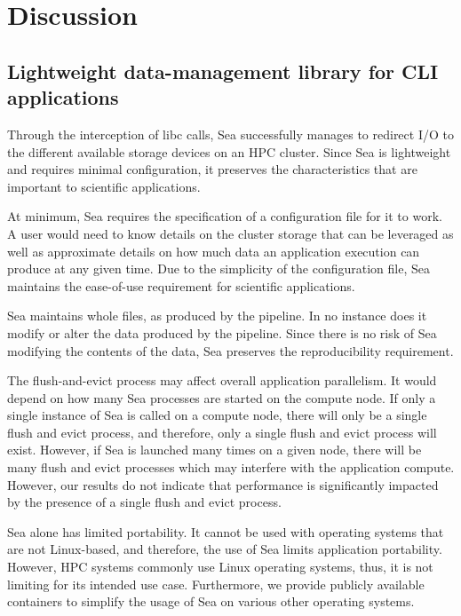 \section{Discussion}

    \subsection{Lightweight data-management library for CLI applications}

    Through the interception of libc calls, Sea successfully manages to redirect
    I/O to the different available storage devices on an HPC cluster.
    Since Sea is lightweight and requires minimal configuration, it preserves
    the characteristics that are important to scientific applications.

    At minimum, Sea requires the specification of a configuration file for it to work.
    A user would need to know details on the cluster storage that can be leveraged as 
    well as approximate details on how much data an application execution can produce 
    at any given time. Due to the simplicity of the configuration file, 
    Sea maintains the ease-of-use requirement for scientific applications.

    Sea maintains whole files, as produced by the pipeline. In no instance does it modify
    or alter the data produced by the pipeline. Since there is no risk of Sea modifying
    the contents of the data, Sea preserves the reproducibility requirement.

    The flush-and-evict process may affect overall application parallelism. It
    would depend on how many Sea processes are started on the compute node. If
    only a single instance of Sea is called on a compute node, there will only
    be a single flush and evict process, and therefore, only a single flush and
    evict process will exist. However, if Sea is launched many times on a given
    node, there will be many flush and evict processes which may interfere with
    the application compute. However, our results do not indicate that
    performance is significantly impacted by the presence of a single flush and
    evict process.  

    Sea alone has limited portability. It cannot be used with operating systems that are
    not Linux-based, and therefore, the use of Sea limits application portability.
    However, HPC systems commonly use Linux operating systems, thus, it is not limiting
    for its intended use case. Furthermore, we provide publicly available containers to
    simplify the usage of Sea on various other operating systems.

